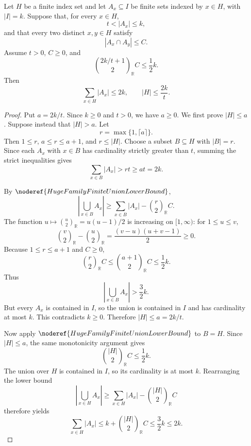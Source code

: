 \begin{helper}
Let \(H\) be a finite index set and let \(A_x\subseteq I\) be finite sets
indexed by \(x\in H\), with \(|I|=k\).  Suppose that, for every \(x\in H\),
\[
t<|A_x|\le k,
\]
and that every two distinct \(x,y\in H\) satisfy
\[
|A_x\cap A_y|\le C.
\]
Assume \(t>0\), \(C\ge0\), and
\[
\binom{2k/t+1}{2}_{\mathbb R}C\le\frac12 k.
\]
Then
\[
\sum_{x\in H}|A_x|\le2k,\qquad |H|\le\frac{2k}{t}.
\]
\end{helper}
\begin{proof}
Put \(a=2k/t\).  Since \(k\ge0\) and \(t>0\), we have \(a\ge0\).  We first
prove \(|H|\le a\).  Suppose instead that \(|H|>a\).  Let
\[
r=\max\{1,\lceil a\rceil\}.
\]
Then \(1\le r\), \(a\le r\le a+1\), and \(r\le |H|\).  Choose a subset
\(B\subseteq H\) with \(|B|=r\).  Since each \(A_x\) with \(x\in B\) has
cardinality strictly greater than \(t\), summing the strict inequalities gives
\[
\sum_{x\in B}|A_x|>rt\ge at=2k.
\]

By \(\noderef{HugeFamilyFiniteUnionLowerBound}\),
\[
\left|\bigcup_{x\in B}A_x\right|
\ge
\sum_{x\in B}|A_x|-\binom r2_{\mathbb R}C.
\]
The function \(u\mapsto \binom u2_{\mathbb R}=u(u-1)/2\) is increasing on
\([1,\infty)\): for \(1\le u\le v\),
\[
\binom v2_{\mathbb R}-\binom u2_{\mathbb R}
=\frac{(v-u)(u+v-1)}2\ge0.
\]
Because \(1\le r\le a+1\) and \(C\ge0\),
\[
\binom r2_{\mathbb R}C
\le \binom{a+1}{2}_{\mathbb R}C
\le \frac12 k.
\]
Thus
\[
\left|\bigcup_{x\in B}A_x\right|>\frac32 k.
\]
But every \(A_x\) is contained in \(I\), so the union is contained in \(I\)
and has cardinality at most \(k\).  This contradicts \(k\ge0\).  Therefore
\(|H|\le a=2k/t\).

Now apply \(\noderef{HugeFamilyFiniteUnionLowerBound}\) to \(B=H\).  Since
\(|H|\le a\), the same monotonicity argument gives
\[
\binom{|H|}{2}_{\mathbb R}C\le \frac12 k.
\]
The union over \(H\) is contained in \(I\), so its cardinality is at most
\(k\).  Rearranging the lower bound
\[
\left|\bigcup_{x\in H}A_x\right|
\ge
\sum_{x\in H}|A_x|-\binom{|H|}{2}_{\mathbb R}C
\]
therefore yields
\[
\sum_{x\in H}|A_x|
\le k+\binom{|H|}{2}_{\mathbb R}C
\le \frac32 k\le2k.
\]
\end{proof}
